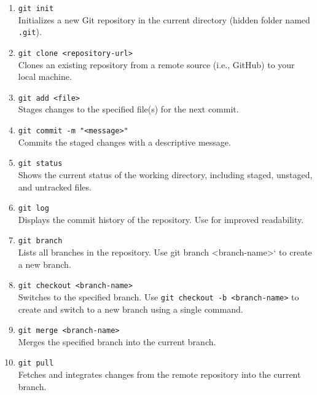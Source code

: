 \documentclass[12pt]{article}
\begin{document}
\begin{enumerate}

    \item \texttt{git init} \\
        Initializes a new Git repository in the current directory (hidden folder
        named \texttt{.git}).

    \item \texttt{git clone <repository-url>} \\
        Clones an existing repository from a remote source (i.e., GitHub) to
        your local machine.

    \item \texttt{git add <file>} \\
        Stages changes to the specified file(s) for the next commit.

    \item \texttt{git commit -m "<message>"} \\
        Commits the staged changes with a descriptive message.

    \item \texttt{git status} \\
        Shows the current status of the working directory, including staged,
        unstaged, and untracked files.

    \item \texttt{git log} \\
        Displays the commit history of the repository. Use
         for improved readability.

    \item \texttt{git branch} \\
        Lists all branches in the repository. Use git branch <branch-name>` to
        create a new branch.

    \item \texttt{git checkout <branch-name>} \\
        Switches to the specified branch. Use
        \texttt{git checkout -b <branch-name>} to create and switch to a new
        branch using a single command.

    \item \texttt{git merge <branch-name>} \\
        Merges the specified branch into the current branch.

    \item \texttt{git pull} \\
        Fetches and integrates changes from the remote repository into the
        current branch.


\end{enumerate}
\end{document}
